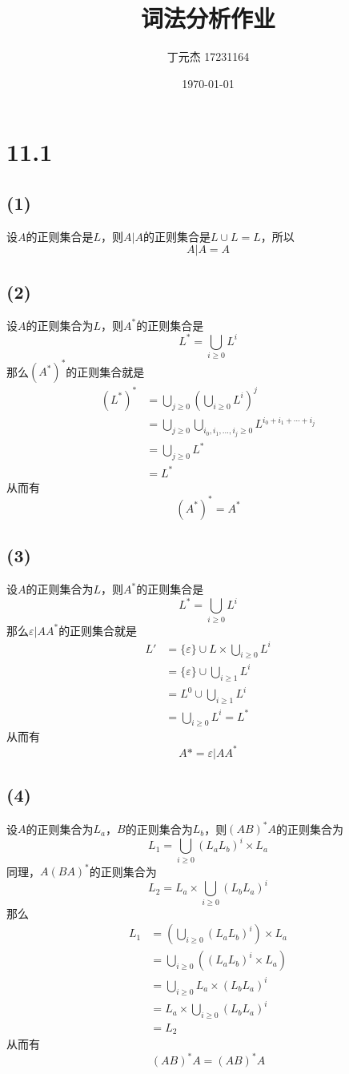 \documentclass[UTF8]{ctexart}
\title{词法分析作业}
\author{丁元杰 17231164}
\date{\today}
\begin{document}
\maketitle

\section*{11.1}
\subsection*{(1)}
设$A$的正则集合是$L$，则$A\big| A$的正则集合是$L\cup L=L$，所以
$$A\big| A = A$$

\subsection*{(2)}
设$A$的正则集合为$L$，则$A^*$的正则集合是
$$L^*=\bigcup_{i\geq 0}{L^i}$$
那么$(A^*)^*$的正则集合就是
\begin{align*}
    (L^*)^*
    &=\bigcup_{j\geq 0}{\left(\bigcup_{i\geq 0}{L^i}\right)^j}\\
    &=\bigcup_{j\geq 0}{\bigcup_{i_0, i_1, \dots, i_j\geq 0}{L^{i_0+i_1+\cdots+i_j}}}\\
    &=\bigcup_{j\geq 0}{L^*}\\
    &=L^*
\end{align*}
从而有
$$(A^*)^*=A^*$$

\subsection*{(3)}
设$A$的正则集合为$L$，则$A^*$的正则集合是
$$L^*=\bigcup_{i\geq 0}{L^i}$$
那么$\varepsilon\big|AA^*$的正则集合就是
\begin{align*}
    L'
    &=\{\varepsilon\}\cup L\times\bigcup_{i\geq 0}{L^i}\\
    &=\{\varepsilon\}\cup\bigcup_{i\geq 1}{L^i}\\
    &=L^0\cup\bigcup_{i\geq 1}{L^i}\\
    &=\bigcup_{i\geq 0}{L^i} = L^*
\end{align*}
从而有
$$A*=\varepsilon\big|AA^*$$

\subsection*{(4)}
设$A$的正则集合为$L_a$，$B$的正则集合为$L_b$，则$(AB)^*A$的正则集合为
$$L_1=\bigcup_{i\geq 0}{(L_aL_b)^i}\times L_a$$
同理，$A(BA)^*$的正则集合为
$$L_2=L_a\times \bigcup_{i\geq 0}{(L_bL_a)^i}$$
那么
\begin{align*}
    L_1
    &=\left(\bigcup_{i\geq 0}{(L_aL_b)^i}\right)\times L_a\\
    &=\bigcup_{i\geq 0}{\left((L_aL_b)^i\times L_a\right)}\\
    &=\bigcup_{i\geq 0}{L_a\times (L_bL_a)^i}\\
    &=L_a\times \bigcup_{i\geq 0}{(L_bL_a)^i}\\
    &=L_2
\end{align*}
从而有
$$(AB)^*A=(AB)^*A$$
\end{document}
